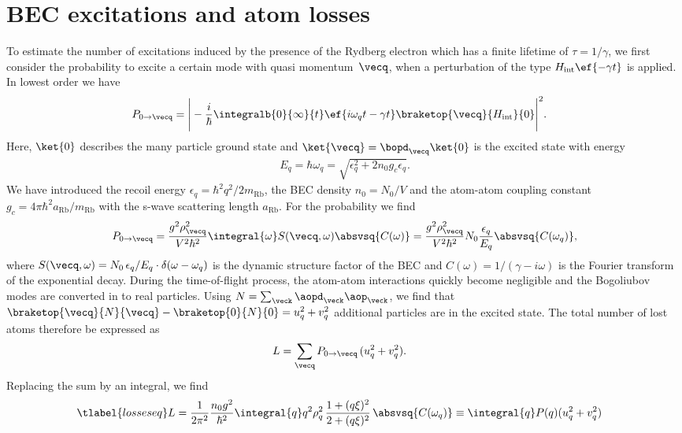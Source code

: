 \section{BEC excitations and atom losses}
To estimate the number of excitations induced by the presence of the Rydberg electron which has a finite lifetime of $\tau=1/\gamma$, we first consider the probability to excite a certain mode with quasi momentum~$\vecq$, when a perturbation of the type $H_\text{int} \ef{-\gamma t}$ is applied. In lowest order we have
\begin{align}
P_{0\rightarrow\vecq}&=\Bigg|-\frac{i}{\hbar}\integralb{0}{\infty}{t}\ef{i\omega_{q}t-\gamma t}\braketop{\vecq}{H_\text{int}}{0}\Bigg|^2.
\end{align}
Here, $\ket{0}$ describes the many particle ground state and $\ket{\vecq}=\bopd_{\vecq}\ket{0}$ is the excited state with energy
\begin{align}
    E_{q}=\hbar\omega_{q}=\sqrt{\epsilon_{q}^2+2n_0g_c\epsilon_{q}}.
\end{align}
We have introduced the recoil energy $\epsilon_{q}=\hbar^2 q^2/2m_\text{Rb}$, the BEC density $n_0=N_0/V$ and the atom-atom coupling constant $g_c=4\pi \hbar ^2a_{\text{Rb}}/m_{\text{Rb}}$ with the s-wave scattering length $a_{\text{Rb}}$.
For the probability we find
\begin{align}
P_{0\rightarrow\vecq}=\frac{g^2 \rho_{\vecq}^2 }{V^2\hbar^2}   \integral{\omega}S(\vecq,\omega)\absvsq{C(\omega)} = \frac{g^2 \rho_{\vecq}^2}{V^2\hbar^2} N_0 \frac{\epsilon_{q}}{E_{q}} \absvsq{C(\omega_q)},
\end{align}
where $S({\vecq},\omega)=N_0 \,\epsilon_{q}/E_{q} \cdot \delta(\omega-\omega_{q})$ is the dynamic structure factor of the BEC and $C(\omega)=1/(\gamma-i \omega)$ is the Fourier transform of the exponential decay.
During the time-of-flight process, the atom-atom interactions quickly become negligible and the Bogoliubov modes are converted in to real particles. Using $N=\sum_{\veck} \aopd_{\veck}\aop_{\veck}$, we find that $\braketop{\vecq}{N}{\vecq}-\braketop{0}{N}{0} = u_{q}^2+v_{q}^2$ additional particles are in the excited state. The total number of lost atoms therefore be expressed as
\begin{align}
L &= \sum_{\vecq} P_{0\rightarrow\vecq}\, (u_{q}^2+v_{q}^2).
\end{align}
Replacing the sum by an integral, we find
\begin{align} \tlabel{losseseq}
L&= \frac{1}{2\pi^2}\frac{n_0 g^2}{\hbar^2} \integral{q} q^2\rho_q^2\,\frac{1+(q\xi)^2}{2+(q\xi)^2} \, \absvsq{C(\omega_q)}  \equiv \integral{q} P(q) (u_{q}^2+v_{q}^2)
\end{align}
